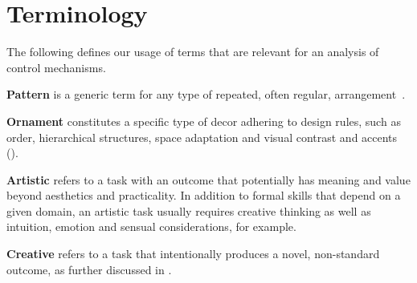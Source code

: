 
\section{Terminology}\label{terminology}
The following defines our usage of terms that are relevant for an analysis of control mechanisms. %

\textbf{Pattern} is a generic term for any type of repeated, often regular, arrangement~\cite{oed_2017}.




\textbf{Ornament} constitutes a specific type of decor adhering to design rules, such as order, hierarchical structures, space adaptation and visual contrast and accents ().

\textbf{Artistic} refers to a task with an outcome that potentially has meaning and value beyond aesthetics and practicality. In addition to formal skills that depend on a given domain, an artistic task usually requires creative thinking as well as intuition, emotion and sensual considerations, for example.

\textbf{Creative} refers to a task that intentionally produces a novel, non-standard outcome, as further discussed in . 

